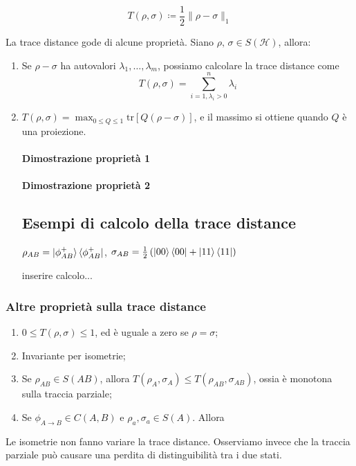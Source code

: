 \documentclass{report}
\begin{document}
\begin{equation}
T(\rho, \sigma) \coloneqq \frac{1}{2}\|\rho - \sigma \|_1
\end{equation}

La trace distance gode di alcune proprietà. Siano $\rho, \, \sigma \in S(\mathcal H)$, allora:
\begin{enumerate}
	\item Se $\rho - \sigma$ ha autovalori $\lambda_1, \dots, \lambda_m$, possiamo calcolare la trace distance come
	\begin{equation}
		T(\rho, \sigma) = \sum _{i = 1, \lambda_i > 0}^n \lambda_i
	\end{equation}
	\item $T(\rho, \sigma) = \max_{0 \leq Q \leq 1} \mathrm{tr}[Q(\rho - \sigma)]$, e il massimo si ottiene quando $Q$ è una proiezione.
	
\paragraph{Dimostrazione proprietà 1}
\paragraph{Dimostrazione proprietà 2}

\subsection{Esempi di calcolo della trace distance}
$\rho_{AB} = \ket{\phi_{AB}^+} \bra{\phi_{AB}^+}$, $\sigma_{AB} = \frac{1}{2}\left( \ket{00}\bra{00} + \ket{11}\bra{11} \right)$

inserire calcolo...
\end{enumerate}

\subsubsection{Altre proprietà sulla trace distance}
\begin{enumerate}
	\item $0 \leq T(\rho, \sigma) \leq 1$, ed è uguale a zero se $\rho = \sigma$;
	\item Invariante per isometrie;
	\item Se $\rho_{AB} \in S(AB)$, allora $T(\rho_A, \sigma_A) \leq T(\rho_{AB}, \sigma_{AB})$, ossia è monotona sulla traccia parziale;
	\item Se $\phi_{A\to B} \in C(A,B)$ e $\rho_a, \sigma_a \in S(A)$. Allora 
\end{enumerate}
Le isometrie non fanno variare la trace distance. Osserviamo invece che la traccia parziale può causare una perdita di distinguibilità tra i due stati. 
\end{document}
